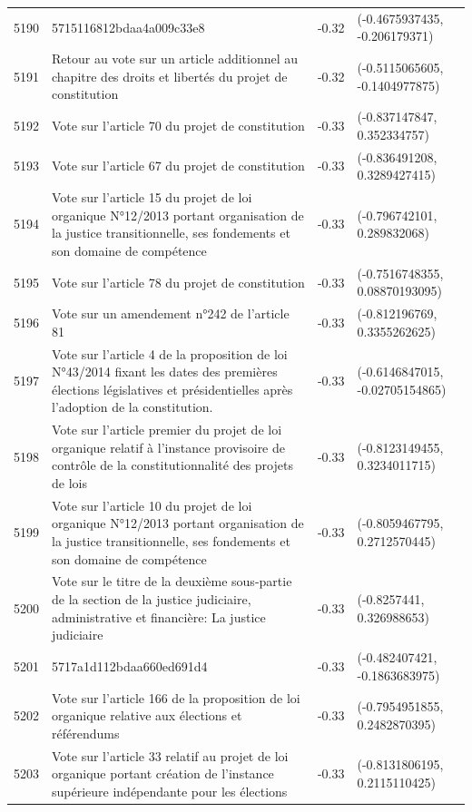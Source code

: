 \begin{table}[ht]
\begin{tabular}{rlrl}
  5190 & 5715116812bdaa4a009c33e8 & -0.32 & (-0.4675937435, -0.206179371) \\ 
  5191 & Retour au vote sur un article additionnel au chapitre des droits et libertés du projet de constitution & -0.32 & (-0.5115065605, -0.1404977875) \\ 
  5192 & Vote sur l'article 70 du projet de constitution & -0.33 & (-0.837147847, 0.352334757) \\ 
  5193 & Vote sur l'article 67 du projet de constitution & -0.33 & (-0.836491208, 0.3289427415) \\ 
  5194 & Vote sur l'article 15 du projet de loi organique N°12/2013 portant organisation de la justice transitionnelle, ses fondements et son domaine de compétence & -0.33 & (-0.796742101, 0.289832068) \\ 
  5195 & Vote sur l'article 78 du projet de constitution & -0.33 & (-0.7516748355, 0.08870193095) \\ 
  5196 & Vote sur un amendement n°242 de l'article 81 & -0.33 & (-0.812196769, 0.3355262625) \\ 
  5197 & Vote sur l'article 4 de la proposition de loi N°43/2014 fixant les dates des premières élections législatives et présidentielles après l'adoption de la constitution. & -0.33 & (-0.6146847015, -0.02705154865) \\ 
  5198 & Vote sur l'article premier du projet de loi organique relatif à l'instance provisoire de contrôle de la constitutionnalité des projets de lois & -0.33 & (-0.8123149455, 0.3234011715) \\ 
  5199 & Vote sur l'article 10 du projet de loi organique N°12/2013 portant organisation de la justice transitionnelle, ses fondements et son domaine de compétence & -0.33 & (-0.8059467795, 0.2712570445) \\ 
  5200 & Vote sur le titre de la deuxième sous-partie de la section de la justice judiciaire, administrative et financière: La justice judiciaire & -0.33 & (-0.8257441, 0.326988653) \\ 
  5201 & 5717a1d112bdaa660ed691d4 & -0.33 & (-0.482407421, -0.1863683975) \\ 
  5202 & Vote sur l'article 166 de la proposition de loi organique relative aux élections et référendums & -0.33 & (-0.7954951855, 0.2482870395) \\ 
  5203 & Vote sur l'article 33 relatif au projet de loi organique portant création de l'instance supérieure indépendante pour les élections & -0.33 & (-0.8131806195, 0.2115110425) \\ 

\end{tabular}
\end{table}
